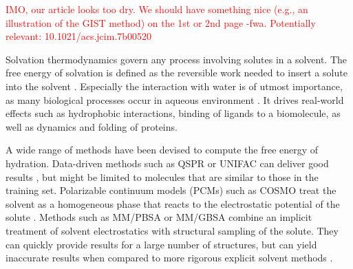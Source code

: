 \documentclass[9pt,tutorial]{livecoms}
\newcommand{\todo}{\textcolor{red}}
\begin{document}
\todo{IMO, our article looks too dry. We should have something nice (e.g., an illustration of the GIST method) on the 1st or 2nd page -fwa.}
\todo{Potentially relevant: 10.1021/acs.jcim.7b00520 }

Solvation thermodynamics govern any process involving solutes in a solvent.
The free energy of solvation is defined as the reversible work needed to insert a solute into the solvent \cite{ben-naim-book}.
Especially the interaction with water is of utmost importance, as many biological processes occur in aqueous environment \cite{Privalov2017-water-review}.
It drives real-world effects such as hydrophobic interactions, binding of ligands to a biomolecule, as well as dynamics and folding of proteins.


A wide range of methods have been devised to compute the free energy of hydration.
Data-driven methods such as QSPR or UNIFAC can deliver good results \cite{Borhani2019-qspr,Fredenslund1975-unifac}, but might be limited to molecules that are similar to those in the training set.
Polarizable continuum models (PCMs) \cite{Miertus1981-pcm} such as COSMO \cite{Klamt1993-cosmo} treat the solvent as a homogeneous phase that reacts to the electrostatic potential of the solute \cite{Mennucci2010-pcm}.
Methods such as MM/PBSA or MM/GBSA \cite{Sitkoff1994-pbsa,Kollman2000-mmpbsa} combine an implicit treatment of solvent electrostatics with structural sampling of the solute.
They can quickly provide results for a large number of structures, but can yield inaccurate results when compared to more rigorous explicit solvent methods \cite{Genheden2015-mmpbsa-review}.
\end{document}
